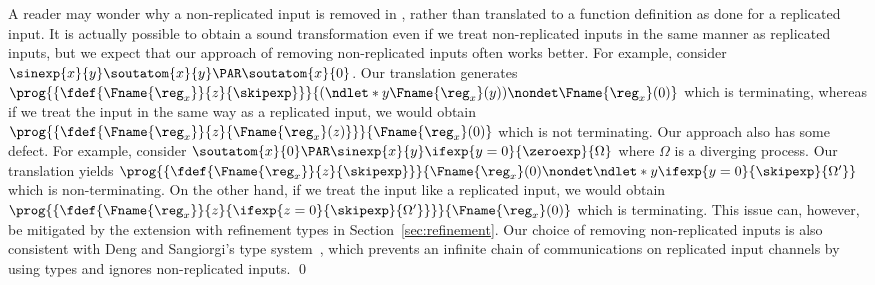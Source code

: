\begin{remark}
A reader may wonder why
a non-replicated input is removed in ,
rather than translated to a function definition as done for a replicated input.
It is actually possible to obtain a sound transformation even if we treat
non-replicated inputs in the same manner as replicated inputs,
but we expect that our approach of removing non-replicated inputs often works
better.
For example,
  consider $\sinexp{x}{y}\soutatom{x}{y} \PAR \soutatom{x}{0}$.
  Our translation generates
  $\prog{\{\fdef{\Fname{\reg_x}}{z}{\skipexp}\}}{(\ndlet*{y}{\Fname{\reg_x}(y)}) \nondet \Fname{\reg_x}(0)}$
  which is terminating,
  whereas if we treat the input in the same way as a replicated input,
  we would obtain
  $\prog{\{\fdef{\Fname{\reg_x}}{z}{\Fname{\reg_x}(z)}\}}{\Fname{\reg_x}(0)}$
  which is not terminating.
 Our approach also has some defect.
  For example, consider
  $\soutatom{x}{0} \PAR \sinexp{x}{y} \ifexp{y=0}{\zeroexp}{\Omega}$
  where $\Omega$ is a diverging process. 
  Our translation yields
  $\prog{\{\fdef{\Fname{\reg_x}}{z}{\skipexp}\}}{\Fname{\reg_x}(0) \nondet \ndlet*{y}{\ifexp{y=0}{\skipexp}{\Omega'}}}$
  which is non-terminating.
  On the other hand, if we treat the input like a replicated input,
  we would obtain
  $\prog{\{\fdef{\Fname{\reg_x}}{z}{\ifexp{z=0}{\skipexp}{\Omega'}}\}}{\Fname{\reg_x}(0)}$
  which is terminating.
  This issue can, however,
  be mitigated by the extension with refinement types in Section~\ref{sec:refinement}.
Our choice of removing non-replicated inputs is also 
consistent with Deng and Sangiorgi's type system~\cite{Deng06IC}, which
prevents an infinite chain of communications on replicated input channels by using types
and ignores non-replicated inputs.
\qed
\end{remark}


